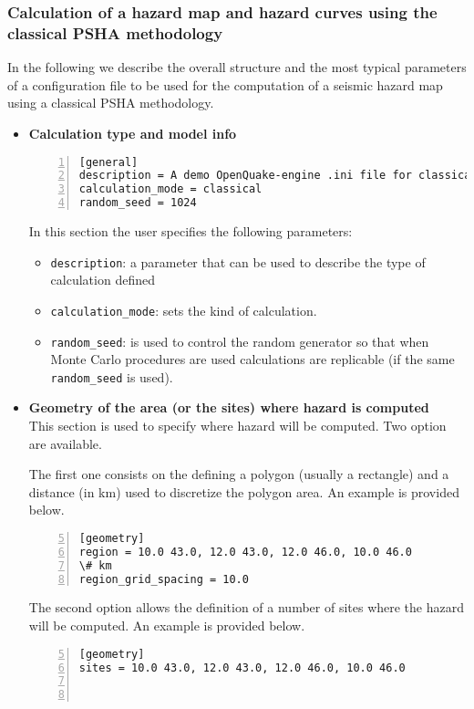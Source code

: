 \subsubsection{Calculation of a hazard map and hazard curves using 
    the classical PSHA methodology}
\label{sec:config_classical_PSHA}
%
In the following we describe the overall structure and the
most typical parameters of a configuration file to be used for the 
computation of a seismic hazard map using a classical PSHA methodology.
\begin{itemize}
\item \textbf{Calculation type and model info}
\begin{Verbatim}[frame=single, commandchars=\\\{\}, fontsize=\small,
    numbers=left, numbersep=2pt]
[general]
description = A demo OpenQuake-engine .ini file for classical PSHA
calculation_mode = classical
random_seed = 1024
\end{Verbatim}
In this section the user specifies the following parameters:
\begin{itemize}
    \item \texttt{description}: a parameter that can be used to describe 
        the type of calculation defined 
    \item \texttt{calculation\_mode}: sets the kind of calculation. 
    \item \texttt{random\_seed}: is used to control the random generator 
        so that when Monte Carlo procedures are used calculations are 
        replicable (if the same \texttt{random\_seed} is used).
\end{itemize}
%
\item \textbf{Geometry of the area (or the sites) where hazard is computed}
    \hfill \\
This section is used to specify where hazard will be computed. Two 
option are available. 

The first one consists on the defining a polygon 
(usually a rectangle) and a distance (in km) used to discretize the 
polygon area. An example is provided below.
\begin{Verbatim}[frame=single, commandchars=\\\{\}, fontsize=\small,
    firstnumber=5, numbers=left, numbersep=2pt]
[geometry]
region = 10.0 43.0, 12.0 43.0, 12.0 46.0, 10.0 46.0
\# km
region_grid_spacing = 10.0
\end{Verbatim}

The second option allows the definition of a number of sites where 
the hazard will be computed. An example is provided below.
\begin{Verbatim}[frame=single, commandchars=\\\{\}, fontsize=\small,
    firstnumber=5, numbers=left, numbersep=2pt]
[geometry]
sites = 10.0 43.0, 12.0 43.0, 12.0 46.0, 10.0 46.0



\end{Verbatim}
\end{itemize}
